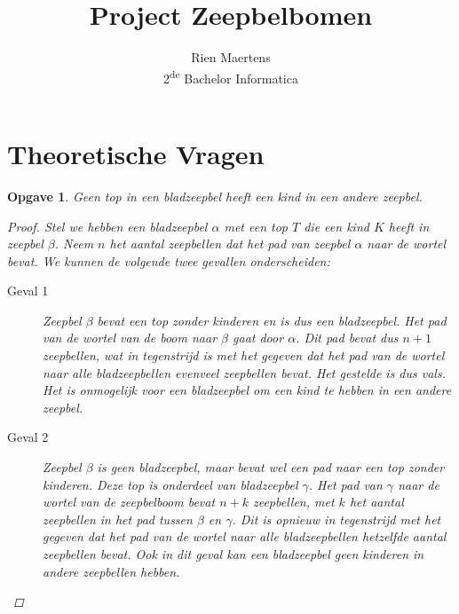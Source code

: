 \documentclass[12pt]{article}
\author{Rien Maertens\\
    2\textsuperscript{de} Bachelor Informatica}
\title{Project Zeepbelbomen}
\newtheorem{opgave}{Opgave}
\begin{document}
    \maketitle
    \part*{Theoretische Vragen}
    \begin{opgave}
        Geen top in een bladzeepbel heeft een kind in een andere zeepbel.
        \begin{proof}
            Stel we hebben een bladzeepbel $\alpha$ met een top $T$ die een kind $K$ heeft in zeepbel $\beta$. 
            Neem $n$ het aantal zeepbellen dat het pad van zeepbel $\alpha$ naar de wortel bevat. 
            We kunnen de volgende twee gevallen onderscheiden:
            \begin{description}
                \item[Geval 1] Zeepbel $\beta$ bevat een top zonder kinderen en is dus een bladzeepbel.
                    Het pad van de wortel van de boom naar $\beta$ gaat door $\alpha$.
                    Dit pad bevat dus $n+1$ zeepbellen, wat in tegenstrijd is met het gegeven dat het pad van de wortel naar alle bladzeepbellen evenveel zeepbellen bevat.
                    Het gestelde is dus vals. Het is onmogelijk voor een bladzeepbel om een kind te hebben in een andere zeepbel.
                \item[Geval 2] Zeepbel $\beta$ is geen bladzeepbel, maar bevat wel een pad naar een top zonder kinderen.
                    Deze top is onderdeel van bladzeepbel $\gamma$.
                    Het pad van $\gamma$ naar de wortel van de zeepbelboom bevat $n+k$ zeepbellen, met $k$ het aantal zeepbellen in het pad tussen $\beta$ en $\gamma$.
                    Dit is opnieuw in tegenstrijd met het gegeven dat het pad van de wortel naar alle bladzeepbellen hetzelfde aantal zeepbellen bevat.
                    Ook in dit geval kan een bladzeepbel geen kinderen in andere zeepbellen hebben.
            \end{description}
        \end{proof}
    \end{opgave}
    \newpage
\end{document}
